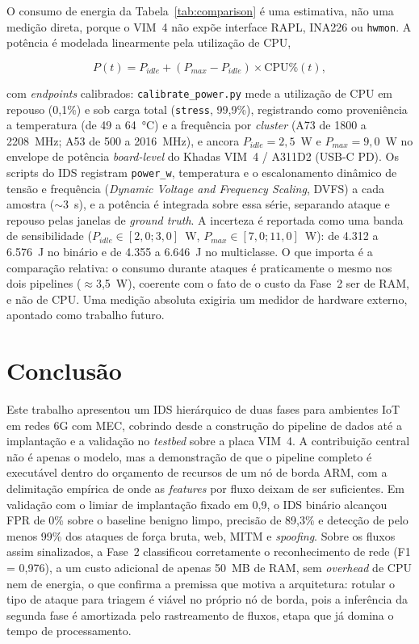 \documentclass[12pt]{article}
\begin{document}
O consumo de energia da Tabela~\ref{tab:comparison} é uma estimativa, não uma
medição direta, porque o VIM~4 não expõe interface RAPL, INA226 ou
\texttt{hwmon}. A potência é modelada linearmente pela utilização de CPU,

\begin{equation}
P(t) = P_{idle} + (P_{max} - P_{idle}) \times \text{CPU\%}(t),
\label{eq:power}
\end{equation}

com \textit{endpoints} calibrados: \texttt{calibrate\_power.py} mede a utilização
de CPU em repouso (0,1\%) e sob carga total (\texttt{stress}, 99,9\%),
registrando como proveniência a temperatura (de 49 a 64~°C) e a frequência por
\textit{cluster} (A73 de 1800 a 2208~MHz; A53 de 500 a 2016~MHz), e ancora
$P_{idle} = 2{,}5$~W e $P_{max} = 9{,}0$~W no envelope de potência
\textit{board-level} do Khadas VIM~4 / A311D2 (USB-C PD). Os scripts do IDS
registram \texttt{power\_w}, temperatura e o escalonamento dinâmico de tensão e
frequência (\textit{Dynamic Voltage and Frequency Scaling}, DVFS) a cada amostra
($\sim$3~s), e a potência é integrada sobre essa série, separando ataque e
repouso pelas janelas de \textit{ground truth}. A incerteza é reportada como uma
banda de sensibilidade ($P_{idle} \in [2{,}0;3{,}0]$~W, $P_{max} \in
[7{,}0;11{,}0]$~W): de 4.312 a 6.576~J no binário e de 4.355 a 6.646~J no
multiclasse. O que importa é a comparação relativa: o consumo durante ataques é
praticamente o mesmo nos dois pipelines ($\approx$3,5~W), coerente com o fato de
o custo da Fase~2 ser de RAM, e não de CPU. Uma medição absoluta exigiria um
medidor de hardware externo, apontado como trabalho futuro.

\section{Conclusão}
\label{sec:conclusao}

Este trabalho apresentou um IDS hierárquico de duas fases para ambientes IoT em
redes 6G com MEC, cobrindo desde a construção do pipeline de dados até a
implantação e a validação no \textit{testbed} sobre a placa VIM~4. A contribuição
central não é apenas o modelo, mas a demonstração de que o pipeline completo é
executável dentro do orçamento de recursos de um nó de borda ARM, com a
delimitação empírica de onde as \textit{features} por fluxo deixam de ser
suficientes. Em validação com o limiar de implantação fixado em 0,9, o IDS
binário alcançou FPR de 0\% sobre o baseline benigno limpo, precisão de 89,3\% e
detecção de pelo menos 99\% dos ataques de força bruta, web, MITM e
\textit{spoofing}. Sobre os fluxos assim sinalizados, a Fase~2 classificou
corretamente o reconhecimento de rede (F1 = 0,976), a um custo adicional de
apenas 50~MB de RAM, sem \textit{overhead} de CPU nem de energia, o que confirma
a premissa que motiva a arquitetura: rotular o tipo de ataque para triagem é
viável no próprio nó de borda, pois a inferência da segunda fase é amortizada
pelo rastreamento de fluxos, etapa que já domina o tempo de processamento.
\end{document}

